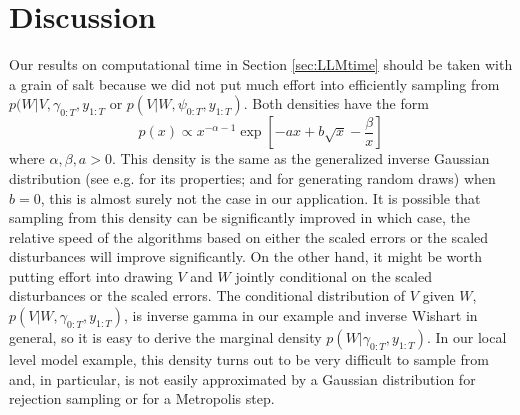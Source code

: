 \documentclass{article}
\begin{document}
\section{Discussion}\label{sec:Discussion}
Our results on computational time in Section \ref{sec:LLMtime} should be taken with a grain of salt because we did not put much effort into efficiently sampling from $p(W|V,\gamma_{0:T},y_{1:T}$ or $p(V|W,\psi_{0:T},y_{1:T})$. Both densities have the form
\[
p(x)\propto x^{-\alpha-1}\exp\left[-ax + b\sqrt{x} - \frac{\beta}{x}\right]
\]
where $\alpha,\beta,a>0$. This density is the same as the generalized inverse Gaussian distribution (see e.g. \citet{jorgensen1982statistical} for its properties; \citet{dagpunar1989easily} and \citet{devroye2012random} for generating random draws) when $b=0$, this is almost surely not the case in our application. It is possible that sampling from this density can be significantly improved in which case, the relative speed of the algorithms based on either the scaled errors or the scaled disturbances will improve significantly. On the other hand, it might be worth putting effort into drawing $V$ and $W$ jointly conditional on the scaled disturbances or the scaled errors. The conditional distribution of $V$ given $W$, $p(V|W,\gamma_{0:T},y_{1:T})$, is inverse gamma in our example and inverse Wishart in general, so it is easy to derive the marginal density $p(W|\gamma_{0:T},y_{1:T})$. In our local level model example, this density turns out to be very difficult to sample from and, in particular, is not easily approximated by a Gaussian distribution for rejection sampling or for a Metropolis step. 
\end{document}
